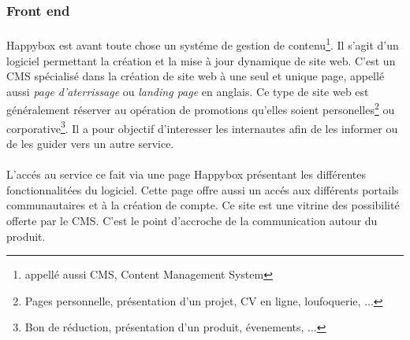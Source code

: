 \documentclass[11pt, a4paper ]{article}
\begin{document}
\begin{spacing}{1.5}
\subsubsection{Front end}
	\paragraph{}
Happybox est avant toute chose un systéme de gestion de contenu\footnote{appellé aussi CMS, Content Management System}. Il s'agit d'un logiciel permettant la création et la mise à jour dynamique de site web.
C'est un CMS spécialisé dans la création de site web à une seul et unique page, appellé aussi \emph{page d'aterrissage} ou \emph{landing page} en anglais. Ce type de site web est généralement réserver au opération de promotions qu'elles soient personelles\footnote{Pages personnelle, présentation d'un projet, CV en ligne, loufoquerie, ...} ou corporative\footnote{Bon de réduction, présentation d'un produit, évenements, ...}. Il a pour objectif d'interesser les internautes afin de les informer ou de les guider vers un autre service.



\paragraph{}
L'accés au service ce fait via une page Happybox présentant les différentes fonctionnalitées du logiciel. Cette page offre aussi un accés aux différents portails communautaires et à la création de compte. Ce site est une vitrine des possibilité offerte par le CMS. C'est le point d'accroche de la communication autour du produit.



\end{spacing}
\end{document}
